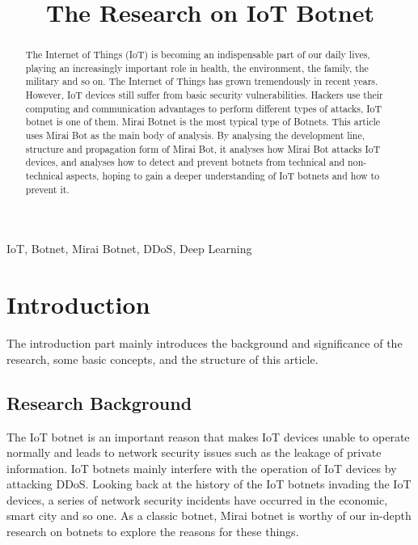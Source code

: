 \documentclass[conference]{IEEEtran}
\begin{document}
\title{The Research on IoT Botnet
\\
{}
}

\author{
}

\maketitle

\begin{abstract}
The Internet of Things (IoT) is becoming an indispensable part of our daily lives, playing an increasingly important role in health, the environment, the family, the military and so on. The Internet of Things has grown tremendously in recent years. However, IoT devices still suffer from basic security vulnerabilities. Hackers use their computing and communication advantages to perform different types of attacks, IoT botnet is one of them. Mirai Botnet is the most typical type of Botnets. This article uses Mirai Bot as the main body of analysis. By analysing the development line, structure and propagation form of Mirai Bot, it analyses how Mirai Bot attacks IoT devices, and analyses how to detect and prevent botnets from technical and non-technical aspects, hoping to gain a deeper understanding of IoT botnets and how to prevent it.
\end{abstract}

\begin{IEEEkeywords}
IoT, Botnet, Mirai Botnet, DDoS, Deep Learning
\end{IEEEkeywords}

\section{\textbf{Introduction}}
The introduction part mainly introduces the background and significance of the research, some basic concepts, and the structure of this article.

\subsection{\textbf{Research Background}}
The IoT botnet is an important reason that makes IoT devices unable to operate normally and leads to network security issues such as the leakage of private information. IoT botnets mainly interfere with the operation of IoT devices by attacking DDoS. Looking back at the history of the IoT botnets invading the IoT devices, a series of network security incidents have occurred in the economic, smart city and so one. As a classic botnet, Mirai botnet is worthy of our in-depth research on botnets to explore the reasons for these things.
\end{document}
